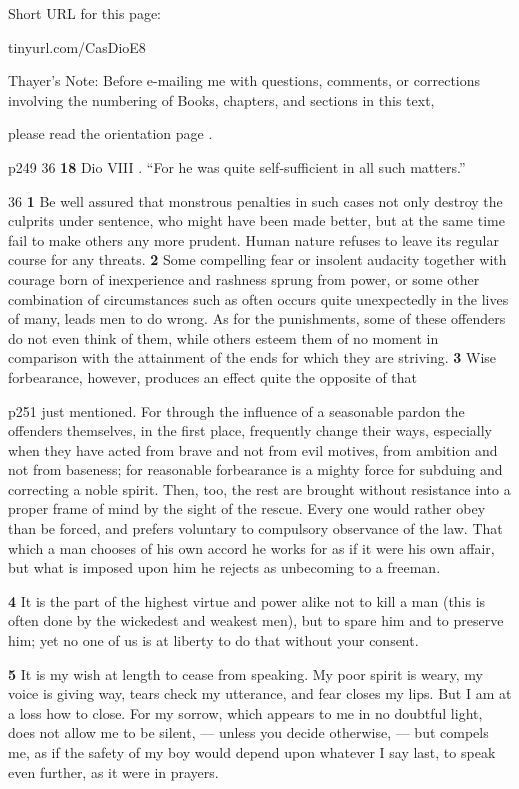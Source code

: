 
Short URL for this page:

tinyurl.com/CasDioE8

Thayer's Note: Before e-mailing me with questions, comments, or corrections involving the numbering of Books, chapters, and sections in this text,

please read the orientation page .

p249
36
\textbf{18} Dio VIII . ``For he was quite self-sufficient in all such matters.''

36
\textbf{1} Be well assured that monstrous penalties in such cases not only destroy the culprits under sentence, who might have been made better, but at the same time fail to make others any more prudent. Human nature refuses to leave its regular course for any threats. \textbf{2} Some compelling fear or insolent audacity together with courage born of inexperience and rashness sprung from power, or some other combination of circumstances such as often occurs quite unexpectedly in the lives of many, leads men to do wrong. As for the punishments, some of these offenders do not even think of them, while others esteem them of no moment in comparison with the attainment of the ends for which they are striving. \textbf{3} Wise forbearance, however, produces an effect quite the opposite of that

p251 just mentioned. For through the influence of a seasonable pardon the offenders themselves, in the first place, frequently change their ways, especially when they have acted from brave and not from evil motives, from ambition and not from baseness; for reasonable forbearance is a mighty force for subduing and correcting a noble spirit. Then, too, the rest are brought without resistance into a proper frame of mind by the sight of the rescue. Every one would rather obey than be forced, and prefers voluntary to compulsory observance of the law. That which a man chooses of his own accord he works for as if it were his own affair, but what is imposed upon him he rejects as unbecoming to a freeman.

\textbf{4} It is the part of the highest virtue and power alike not to kill a man (this is often done by the wickedest and weakest men), but to spare him and to preserve him; yet no one of us is at liberty to do that without your consent.

\textbf{5} It is my wish at length to cease from speaking. My poor spirit is weary, my voice is giving way, tears check my utterance, and fear closes my lips. But I am at a loss how to close. For my sorrow, which appears to me in no doubtful light, does not allow me to be silent, \texthebrew{—} unless you decide otherwise, \texthebrew{—} but compels me, as if the safety of my boy would depend upon whatever I say last, to speak even further, as it were in prayers.

